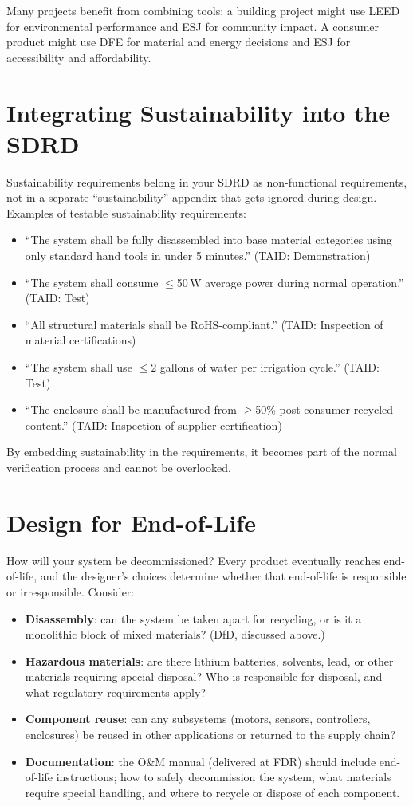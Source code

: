 Many projects benefit from combining tools: a building project might use LEED for environmental performance and ESJ for community impact. A consumer product might use DFE for material and energy decisions and ESJ for accessibility and affordability.

\section{Integrating Sustainability into the SDRD}
Sustainability requirements belong in your SDRD as non-functional requirements, not in a separate ``sustainability'' appendix that gets ignored during design. Examples of testable sustainability requirements:

\begin{itemize}[nosep,leftmargin=1.5em]
\item ``The system shall be fully disassembled into base material categories using only standard hand tools in under 5 minutes.'' (TAID: Demonstration)
\item ``The system shall consume $\leq$50\,W average power during normal operation.'' (TAID: Test)
\item ``All structural materials shall be RoHS-compliant.'' (TAID: Inspection of material certifications)
\item ``The system shall use $\leq 2$ gallons of water per irrigation cycle.'' (TAID: Test)
\item ``The enclosure shall be manufactured from $\geq$50\% post-consumer recycled content.'' (TAID: Inspection of supplier certification)
\end{itemize}

By embedding sustainability in the requirements, it becomes part of the normal verification process and cannot be overlooked.

\section{Design for End-of-Life}
How will your system be decommissioned? Every product eventually reaches end-of-life, and the designer's choices determine whether that end-of-life is responsible or irresponsible. Consider:

\begin{itemize}[nosep,leftmargin=1.5em]
\item \textbf{Disassembly}: can the system be taken apart for recycling, or is it a monolithic block of mixed materials? (DfD, discussed above.)
\item \textbf{Hazardous materials}: are there lithium batteries, solvents, lead, or other materials requiring special disposal? Who is responsible for disposal, and what regulatory requirements apply?
\item \textbf{Component reuse}: can any subsystems (motors, sensors, controllers, enclosures) be reused in other applications or returned to the supply chain?
\item \textbf{Documentation}: the O\&M manual (delivered at FDR) should include end-of-life instructions; how to safely decommission the system, what materials require special handling, and where to recycle or dispose of each component.
\end{itemize}

